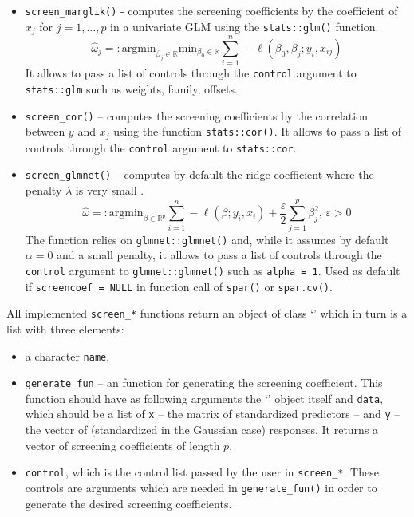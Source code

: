 \documentclass[
  article]{jss}
\newcommand{\class}[1]{`\code{#1}'}
\begin{document}
\begin{itemize}
\item
  \texttt{screen\_marglik()} - computes the screening coefficients by
  the coefficient of \(x_j\) for \(j =1,\dots,p\) in a univariate GLM
  using the \texttt{stats::glm()} function. \[
   \hat\omega_j=:\text{argmin}_{\beta_j\in \mathbb{R}}\text{min}_{{\beta_0}\in\mathbb{R}}\sum_{i=1}^n -\ell(\beta_0,\beta_j;y_i,x_{ij})
   \] It allows to pass a list of controls through the \texttt{control}
  argument to \texttt{stats::glm} such as weights, family, offsets.
\item
  \texttt{screen\_cor()} -- computes the screening coefficients by the
  correlation between \(y\) and \(x_j\) using the function
  \texttt{stats::cor()}. It allows to pass a list of controls through
  the \texttt{control} argument to \texttt{stats::cor}.
\item
  \texttt{screen\_glmnet()} -- computes by default the ridge coefficient
  where the penalty \(\lambda\) is very small \citep[see][ for
  clarification]{parzer2024glms}. \[
  \hat\omega=: \text{argmin}_{{\beta}\in\mathbb{R}^p}\sum_{i=1}^n -\ell(\beta;y_i,x_i) + \frac{\varepsilon}{2}\sum_{j=1}^p{\beta}_j^2, \, \varepsilon > 0
  \] The function relies on \texttt{glmnet::glmnet()} and, while it
  assumes by default \(\alpha = 0\) and a small penalty, it allows to
  pass a list of controls through the \texttt{control} argument to
  \texttt{glmnet::glmnet()} such as \texttt{alpha\ =\ 1}. Used as
  default if \texttt{screencoef\ =\ NULL} in function call of
  \texttt{spar()} or \texttt{spar.cv()}.
\end{itemize}

All implemented \texttt{screen\_*} functions return an object of class
\class{screencoef} which in turn is a list with three elements:

\begin{itemize}
\item
  a character \texttt{name},
\item
  \texttt{generate\_fun} -- an  function for generating the
  screening coefficient. This function should have as following
  arguments the \class{screencoef} object itself and \texttt{data},
  which should be a list of \texttt{x} -- the matrix of standardized
  predictors -- and \texttt{y} -- the vector of (standardized in the
  Gaussian case) responses. It returns a vector of screening
  coefficients of length \(p\).
\item
  \texttt{control}, which is the control list passed by the user in
  \texttt{screen\_*}. These controls are arguments which are needed in
  \texttt{generate\_fun()} in order to generate the desired screening
  coefficients.
\end{itemize}
\end{document}
